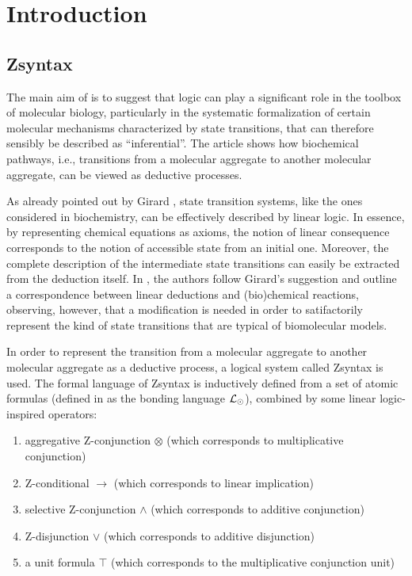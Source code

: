 \section{Introduction}

\subsection{Zsyntax}

The main aim of \cite{adding-logic} is to suggest that logic can play a
significant role in the toolbox of molecular biology, particularly in the
systematic formalization of certain molecular mechanisms characterized by
state transitions, that can therefore sensibly be described as ``inferential''.
The article shows how biochemical pathways, i.e., transitions from a molecular
aggregate to another molecular aggregate, can be viewed as deductive processes.

As already pointed out by Girard \cite{ll-syntax-semantics}, state transition
systems, like the ones considered in biochemistry, can be effectively described
by linear logic.  In essence, by representing chemical equations as axioms, the
notion of linear consequence corresponds to the notion of accessible state from
an initial one. Moreover, the complete description of the intermediate state
transitions can easily be extracted from the deduction itself.
In \cite{adding-logic}, the authors follow Girard's suggestion and outline a
correspondence between linear deductions and (bio)chemical reactions, observing,
however, that a modification is needed in order to satifactorily represent
the kind of state transitions that are typical of biomolecular models.

In order to represent the transition from a molecular aggregate to another
molecular aggregate as a deductive process, a logical system called Zsyntax is
used. The formal language of Zsyntax is inductively defined from a set of atomic
formulas (defined in \cite{adding-logic} as the bonding language
$\mathcal{L}_{\odot}$), combined by some linear logic-inspired operators:

\begin{enumerate}
\item aggregative Z-conjunction $\otimes$ (which corresponds to multiplicative
  conjunction)
\item Z-conditional $\rightarrow$ (which corresponds to linear implication)
\item selective Z-conjunction $\wedge$ (which corresponds to additive
  conjunction)
\item Z-disjunction $\vee$ (which corresponds to additive disjunction)
\item a unit formula $\top$ (which corresponds to the multiplicative conjunction
  unit)
\end{enumerate}

